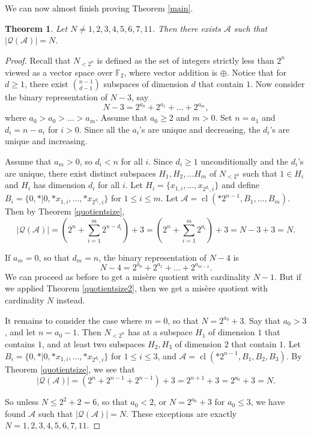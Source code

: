 \documentclass{amsart}
\theoremstyle{plain}
\newtheorem{thm}{Theorem}
\theoremstyle{definition}
\theoremstyle{remark}
\numberwithin{equation}{section}
\numberwithin{thm}{section}
\DeclareMathOperator{\cl}{cl}
\begin{document}
We can now almost finish proving Theorem \ref{main}.
\begin{thm}
    Let $N\neq  1,2,3,4,5,6,7,11$. Then there exists $\mathscr{A}$ such that $|\mathcal{Q}(\mathscr{A})| = N$.
\end{thm}
\begin{proof}

Recall that $N_{<2^n}$ is defined as the set of integers strictly less than $2^n$ viewed as a vector space over $\mathbb{F}_2$, where vector addition is $\oplus$. Notice that for $d\geq 1$, there exist $\binom{n-1}{d-1}$ subspaces of dimension $d$ that contain $1$. Now consider the binary representation of $N -3$, say \begin{equation}
    N-3 = 2^{a_0} + 2^{a_1} + \dots + 2^{a_{m}},
\end{equation}
where $a_0> a_0 > \dots > a_{m}$. Assume that $a_0 \geq 2$ and $m >0$. Set $n = a_1$ and $d_i = n - a_{i}$ for $i>0$. Since all the $a_i$'s are unique and decreasing, the $d_i$'s are unique and increasing. 

Assume that $a_m > 0$, so $d_i < n$ for all $i$.
Since $d_i \geq 1$ unconditionally and the $d_i$'s are unique, there exist distinct subspaces $H_1,H_2,\dots H_m$ of $N_{<2^n}$ such that $1 \in H_i$ and $H_i$ has dimension $d_i$ for all $i$. Let $H_i = \{x_{1,i},\dots,x_{2^{d_i},i}\}$ and define $B_i = \{0,*|0,*x_{1,i},\dots,*x_{2^{d_i},i}\}$ for $1 \leq i \leq m$. Let $\mathscr{A} = \cl( *2^{n-1},B_1,\dots,B_m ) $. Then by Theorem \ref{quotientsize}, \begin{equation}
    \left |\mathcal{Q} (\mathscr{A})\right | = \left( 2^n +\sum_{i=1}^m 2^{n-d_i} \right) +3 = \left( 2^n +\sum_{i=1}^m 2^{a_i} \right) +3 = N-3+3=N.
\end{equation}

If $a_m = 0$, so that $d_m = n$, the binary representation of $N-4$ is \begin{equation}
   N-4 = 2^{a_0} + 2^{a_1} + \dots + 2^{a_{m-1}}.
\end{equation}
We can proceed as before to get a mis\`ere quotient with cardinality $N-1$. But if we applied Theorem \ref{quotientsize2}, then we get a mis\`ere quotient with cardinality $N$ instead.

It remains to consider the case where $ m  =0$, so that $N = 2^{a_0} + 3$. Say that $a_0 > 3$, and let $n = a_0 -1$. Then $N_{<2^n}$ has at a subspace $H_1$ of dimension $1$ that contains $1$, and at least two subspaces $H_2,H_3$ of dimension $2$ that contain $1$.  Let  $B_i = \{0,*|0,*x_{1,i},\dots,*x_{2^{d_i},i}\}$ for $1 \leq i \leq 3$, and $\mathscr{A} = \cl( *2^{n-1},B_1,B_2,B_3 ) $. By Theorem \ref{quotientsize}, we see that \begin{equation}
    |\mathcal{Q}(\mathscr{A})| = \left(2^{n} + 2^{n-1} + 2^{n-1} \right)+3 = 2^{n+1}+3 = 2^{a_0}+3 =N.
\end{equation}

So unless $N \leq 2^2+2 = 6$, so that $a_0 < 2$, or $N = 2^{a_0} + 3$ for $a_0 \leq 3$, we have found $\mathscr{A}$ such that $|\mathcal{Q}(\mathscr{A})| = N$. These exceptions are exactly $N = 1,2,3,4,5,6,7,11$.
\end{proof}
\end{document}
